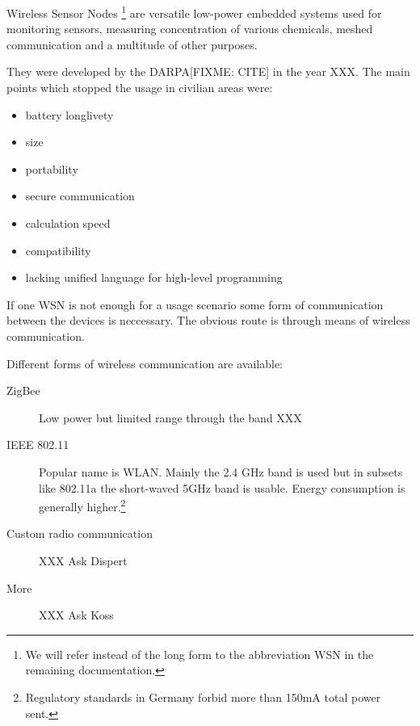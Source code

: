 Wireless Sensor Nodes \footnote{We will refer instead of the long form to the abbreviation \textsc{WSN} in the remaining documentation.}
are versatile low-power embedded systems used for monitoring sensors, measuring concentration of various chemicals, meshed communication
and a multitude of other purposes.

They were developed by the DARPA[FIXME: CITE] in the year XXX. The main points which stopped the usage in civilian areas were:

\begin{itemize}
\item battery longlivety
\item size
\item portability
\item secure communication
\item calculation speed
\item compatibility
\item lacking unified language for high-level programming
\end{itemize}

If one \textsc{WSN} is not enough for a usage scenario some form of communication between the devices is neccessary. The obvious
route is through means of wireless communication.

Different forms of wireless communication are available:

\begin{description}
\item[ZigBee] Low power but limited range through the band XXX
\item[IEEE 802.11] Popular name is \textsc{WLAN}. Mainly the 2.4 GHz band is used but in subsets like 802.11a the short-waved 5GHz band is usable.
Energy consumption is generally higher.\footnote{Regulatory standards in Germany forbid more than 150mA total power sent.}
\item[Custom radio communication] XXX Ask Dispert
\item[More] XXX Ask Koss
\end{description}
